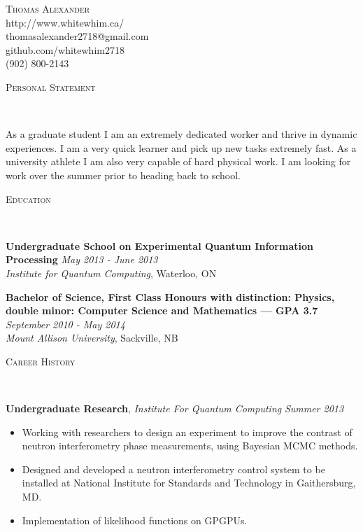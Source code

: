 \documentclass[9pt]{article}
\newenvironment{changemargin}[2]{%
  \begin{list}{}{%
    \setlength{\topsep}{0pt}%
    \setlength{\leftmargin}{#1}%
    \setlength{\rightmargin}{#2}%
    \setlength{\listparindent}{\parindent}%
    \setlength{\itemindent}{\parindent}%
    \setlength{\parsep}{\parskip}%
  }%
  \item[]}{\end{list}
}
\newcommand{\lineover}{
	\begin{changemargin}{-0.05in}{-0.05in}
		\vspace*{-8pt}
		\hrulefill \\
		\vspace*{-2pt}
	\end{changemargin}
}
\newcommand{\header}[1]{
	\begin{changemargin}{-0.5in}{-0.5in}
		\scshape{#1}\\
  	\lineover
	\end{changemargin}
}
\newcommand{\contact}[5]{
	\begin{changemargin}{-0.5in}{-0.5in}
		\begin{center}
			{\Large \scshape {#1}}\\ \smallskip
			{#2}\\ \smallskip 
			{#3}\\ \smallskip
			{#5}\\ \smallskip
			{#4}\smallskip
		\end{center}
	\end{changemargin}
}
\newenvironment{body} {
	\vspace*{-16pt}
	\begin{changemargin}{-0.25in}{-0.5in}
  }	
	{\end{changemargin}
}
\begin{document}
\contact{Thomas Alexander}{http://www.whitewhim.ca/}{thomasalexander2718@gmail.com}{(902) 800-2143}{github.com/whitewhim2718}


\header{Personal Statement}

\begin{body}
	\vspace{14pt}
	As a graduate student I am an extremely dedicated worker and thrive in dynamic experiences. I am a very quick learner and pick up new tasks extremely fast. As a university athlete I am also very capable of hard physical work. I am looking for work over the summer prior to heading back to school. 
\smallskip


\header{Education}
\begin{body}
	\vspace{14pt}
	\textbf{Undergraduate School on Experimental Quantum Information Processing}{} \hfill \emph{May 2013 - June 2013}{} \\
	\emph{Institute for Quantum Computing}, Waterloo, ON{} \\
  
\end{body}
\begin{body}
	\vspace{14pt}
	\textbf{Bachelor of Science, First Class Honours with distinction: Physics, double minor: Computer Science and Mathematics — GPA 3.7 }{} \hfill \emph{September 2010 - May 2014}{} \\
	\emph{Mount Allison University}, Sackville, NB{} \\
  
\end{body}

\smallskip


\header{Career History}

\begin{body}
	\vspace{14pt}
	\textbf{Undergraduate Research}, \emph{Institute For Quantum Computing} \hfill \emph{Summer 2013}\\
	\vspace*{-4pt}
	\begin{itemize} \itemsep -0pt  %
		\item Working with researchers to design an experiment to improve the contrast of neutron interferometry phase measurements, using Bayesian MCMC methods.  
		\item Designed and developed a neutron interferometry control system to be installed at National Institute for Standards and Technology in Gaithersburg, MD.
		\item Implementation of likelihood functions on GPGPUs. 


\end{itemize}
\end{body}
\end{body}
\end{document}
